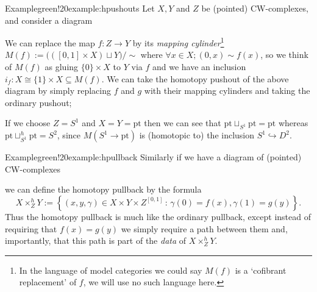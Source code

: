 \begin{env}{Example}{green!20}{example:hpushouts}
	Let $X, Y$ and $Z$ be (pointed) CW-complexes, and consider a diagram
	\begin{center}
	\end{center}
	We can replace the map $f : Z \to Y$ by its \textit{mapping cylinder}\footnote{In the language of model categories we could say $M(f)$ is a `cofibrant replacement' of $f$, we will use no such language here.} $M(f) := \Big(([0,1]\times X) \sqcup Y\Big)/\sim$ where $\forall x \in X; (0,x) \sim f(x)$, so we think of $M(f)$ as gluing $\{0\}\times X$ to $Y$ via $f$ and we have an inclusion $i_f : X \cong \{1\}\times X\subseteq M(f)$. We can take the homotopy pushout of the above diagram by simply replacing $f$ and $g$ with their mapping cylinders and taking the ordinary pushout;
	\begin{center}
	\end{center}
	If we choose $Z = S^1$ and $X = Y = \text{pt}$ then we can see that $\text{pt}\sqcup_{S^1}\text{pt} = \text{pt}$ whereas $\text{pt}\sqcup_{S^1}^h \text{pt} = S^2$, since $M(S^1 \to \text{pt})$ is (homotopic to) the inclusion $S^1 \hookrightarrow D^2$.
\end{env}

\begin{env}{Example}{green!20}{example:hpullback}
Similarly if we have a diagram of (pointed) CW-complexes
	\begin{center}
	\end{center}
we can define the homotopy pullback by the formula
	\[
	X \times_Z^h Y 
	:= \left\{(x,y,\gamma) \in X \times Y \times Z^{[0,1]} \,:\, \gamma(0) = f(x), \gamma(1)=g(y) \right\}.
	\]
	Thus the homotopy pullback is much like the ordinary pullback, except instead of requiring that $f(x) = g(y)$ we simply require a path between them and, importantly, that this path is part of the \textit{data} of $X \times_Z^h Y$. 
\end{env}

